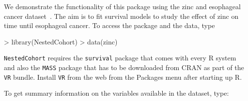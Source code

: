 \documentclass[10pt]{article}
\begin{document}
We demonstrate the functionality of this package using the zinc and esophageal cancer
dataset~\cite{Abnet:05}.  The aim is to fit survival models to study the effect of zinc on
time until esophageal cancer.  To access the package and the data, type

\begin{Schunk}
\begin{Sinput}
> library(NestedCohort)
> data(zinc)
\end{Sinput}
\end{Schunk}

\texttt{NestedCohort} requires the \texttt{survival} package that comes with every R
system and also the \texttt{MASS} package that has to be downloaded from CRAN as part of
the \texttt{VR} bundle.  Install \texttt{VR} from the web from the Packages menu after
starting up R.

To get summary information on the variables available in the dataset, type:
\end{document}
